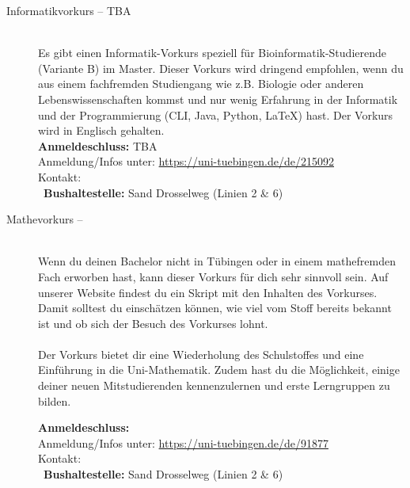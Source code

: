 \begin{description}
\ifmaster
    \ifbinfo
        \item[Informatikvorkurs -- TBA]\ \\
		Es gibt einen Informatik-Vorkurs speziell für Bioinformatik-Studierende (Variante B) im Master. 
		Dieser Vorkurs wird dringend empfohlen, wenn du aus einem fachfremden Studiengang wie z.B. Biologie oder anderen Lebenswissenschaften kommst und nur wenig Erfahrung in der Informatik und der Programmierung (CLI, Java, Python, \LaTeX) hast. Der Vorkurs wird in Englisch gehalten. \\
		\textbf{Anmeldeschluss:} TBA\\
		Anmeldung/Infos unter: \url{https://uni-tuebingen.de/de/215092}\\
		Kontakt: \texttt{\bioinfoKontakt}\\
        ~\textbf{Bushaltestelle:} Sand Drosselweg (Linien 2 \& 6)
    \fi
\fi

\ifmaster
	\ifml %
	\else
		\ifkogwiss %
		\else
			\iflehramt %
			\else
				\item[Mathevorkurs -- \mathedatum~\YEAR]~\\
				Wenn du deinen Bachelor nicht in Tübingen oder in einem mathefremden Fach erworben hast, kann dieser Vorkurs für dich sehr sinnvoll sein. Auf unserer Website findest du ein Skript mit den Inhalten des Vorkurses. Damit solltest du einschätzen können, wie viel vom Stoff bereits bekannt ist und ob sich der Besuch des Vorkurses lohnt.\\\\
				Der Vorkurs bietet dir eine Wiederholung des Schulstoffes und eine Einführung in die Uni-Mathematik. Zudem hast du die Möglichkeit, einige deiner neuen Mitstudierenden kennenzulernen und erste Lerngruppen zu bilden.

				\textbf{Anmeldeschluss:} \matheanmeldung\YEAR\\
				Anmeldung/Infos unter: \url{https://uni-tuebingen.de/de/91877}\\
				Kontakt: \texttt{\mathkontakt}\\
				\ifsommersemester
				~\textbf{Bushaltestelle:} Sand Drosselweg (Linien 2 \& 6) 
				\fi
			\fi
		\fi
	\fi
\fi


\end{description}
